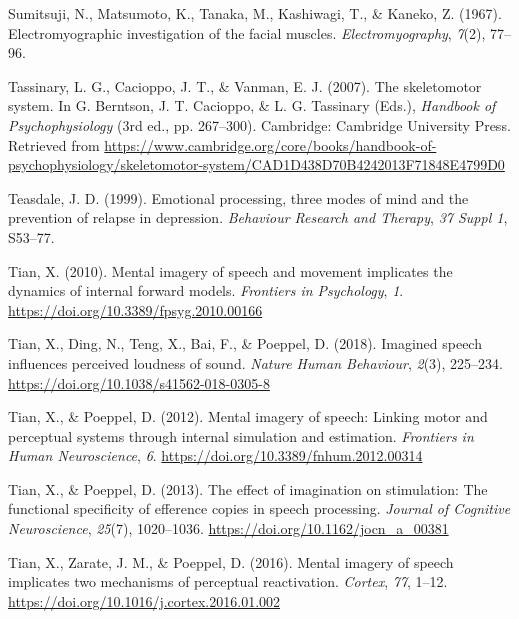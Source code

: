 \documentclass[a4paper,12pt,twoside,onecolumn,openright,final,oldfontcommands]{memoir}
\begin{document}
\leavevmode\hypertarget{ref-sumitsuji_electromyographic_1967}{}%
Sumitsuji, N., Matsumoto, K., Tanaka, M., Kashiwagi, T., \& Kaneko, Z. (1967). Electromyographic investigation of the facial muscles. \emph{Electromyography}, \emph{7}(2), 77--96.

\leavevmode\hypertarget{ref-berntson_skeletomotor_2007}{}%
Tassinary, L. G., Cacioppo, J. T., \& Vanman, E. J. (2007). The skeletomotor system. In G. Berntson, J. T. Cacioppo, \& L. G. Tassinary (Eds.), \emph{Handbook of Psychophysiology} (3rd ed., pp. 267--300). Cambridge: Cambridge University Press. Retrieved from \url{https://www.cambridge.org/core/books/handbook-of-psychophysiology/skeletomotor-system/CAD1D438D70B4242013F71848E4799D0}

\leavevmode\hypertarget{ref-teasdale_emotional_1999}{}%
Teasdale, J. D. (1999). Emotional processing, three modes of mind and the prevention of relapse in depression. \emph{Behaviour Research and Therapy}, \emph{37 Suppl 1}, S53--77.

\leavevmode\hypertarget{ref-tian_mental_2010}{}%
Tian, X. (2010). Mental imagery of speech and movement implicates the dynamics of internal forward models. \emph{Frontiers in Psychology}, \emph{1}. \url{https://doi.org/10.3389/fpsyg.2010.00166}

\leavevmode\hypertarget{ref-tian_imagined_2018}{}%
Tian, X., Ding, N., Teng, X., Bai, F., \& Poeppel, D. (2018). Imagined speech influences perceived loudness of sound. \emph{Nature Human Behaviour}, \emph{2}(3), 225--234. \url{https://doi.org/10.1038/s41562-018-0305-8}

\leavevmode\hypertarget{ref-tian_mental_2012}{}%
Tian, X., \& Poeppel, D. (2012). Mental imagery of speech: Linking motor and perceptual systems through internal simulation and estimation. \emph{Frontiers in Human Neuroscience}, \emph{6}. \url{https://doi.org/10.3389/fnhum.2012.00314}

\leavevmode\hypertarget{ref-tian_effect_2013}{}%
Tian, X., \& Poeppel, D. (2013). The effect of imagination on stimulation: The functional specificity of efference copies in speech processing. \emph{Journal of Cognitive Neuroscience}, \emph{25}(7), 1020--1036. \url{https://doi.org/10.1162/jocn_a_00381}

\leavevmode\hypertarget{ref-tian_mental_2016}{}%
Tian, X., Zarate, J. M., \& Poeppel, D. (2016). Mental imagery of speech implicates two mechanisms of perceptual reactivation. \emph{Cortex}, \emph{77}, 1--12. \url{https://doi.org/10.1016/j.cortex.2016.01.002}
\end{document}
